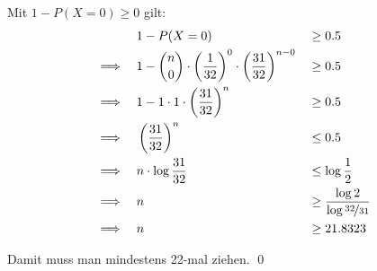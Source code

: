 \documentclass{abgabe}
\begin{document}
\begin{questions}
\begin{parts}
\begin{solution}
            Mit $1 - P(X = 0) \geq 0$ gilt: 
            \begin{alignat*}{2}
                               & 1 - P(X = 0)                                                                              &  & \geq 0.5                                   \\ 
                \implies \quad & 1 - \binom{n}{0} \cdot \left(\frac{1}{32}\right)^0 \cdot \left(\frac{31}{32}\right)^{n-0} &  & \geq 0.5                                   \\
                \implies \quad & 1 - 1 \cdot 1 \cdot \left(\frac{31}{32}\right)^{n}                                        &  & \geq 0.5                                   \\
                \implies \quad & \left(\frac{31}{32}\right)^{n}                                                            &  & \leq 0.5                                   \\
                \implies \quad & n \cdot \log \frac{31}{32}                                                                &  & \leq \log \frac{1}{2}                      \\
                \implies \quad & n                                                                                         &  & \geq \frac{\log 2}{\log \nicefrac{32}{31}} \\
                \implies \quad & n                                                                                         &  & \geq 21.8323                               \\
            \end{alignat*}
            
            Damit muss man mindestens 22-mal ziehen. \qed
        \end{solution}
    \end{parts}
\end{questions}
\end{document}

